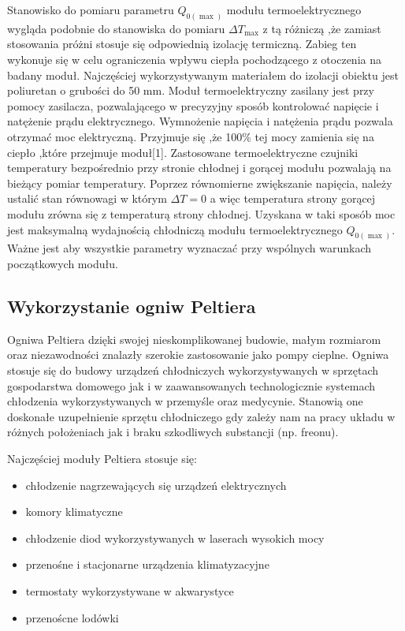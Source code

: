 \documentclass[oneside]{mgr}
\begin{document}
Stanowisko do pomiaru parametru $Q_{0(\max)}$ modułu termoelektrycznego wygląda podobnie do stanowiska do pomiaru $\Delta T_{\max}$ z tą różniczą ,że zamiast stosowania próżni stosuje się odpowiednią izolację termiczną. Zabieg ten wykonuje się w celu ograniczenia wpływu ciepła pochodzącego z otoczenia na badany moduł. Najczęściej wykorzystywanym materiałem do izolacji obiektu jest poliuretan o grubości do 50 mm. Moduł termoelektryczny zasilany jest przy pomocy zasilacza, pozwalającego w precyzyjny sposób kontrolować napięcie i natężenie prądu elektrycznego. Wymnożenie napięcia i natężenia prądu pozwala otrzymać moc elektryczną. Przyjmuje się ,że 100\% tej mocy zamienia się na ciepło ,które przejmuje moduł[1]. Zastosowane termoelektryczne czujniki temperatury bezpośrednio przy stronie chłodnej i gorącej modułu pozwalają na bieżący pomiar temperatury. Poprzez równomierne zwiększanie napięcia, należy ustalić stan równowagi w którym $\Delta T = 0$ a więc temperatura strony gorącej modułu zrówna się z temperaturą strony chłodnej. Uzyskana w taki sposób moc jest maksymalną wydajnością chłodniczą modułu termoelektrycznego $Q_{0(\max)}$. Ważne jest aby wszystkie parametry wyznaczać przy wspólnych warunkach początkowych modułu.

\subsection{Wykorzystanie ogniw Peltiera}

Ogniwa Peltiera dzięki swojej nieskomplikowanej budowie, małym rozmiarom oraz niezawodności znalazły szerokie zastosowanie jako pompy cieplne. Ogniwa stosuje się do budowy urządzeń chłodniczych wykorzystywanych w sprzętach gospodarstwa domowego jak i w zaawansowanych technologicznie systemach chłodzenia wykorzystywanych w przemyśle oraz medycynie. Stanowią one doskonałe uzupełnienie sprzętu chłodniczego gdy zależy nam na pracy układu w różnych położeniach jak i braku szkodliwych substancji (np. freonu).

Najczęściej moduły Peltiera stosuje się:
\begin{itemize}
    \item chłodzenie nagrzewających się urządzeń elektrycznych
    \item komory klimatyczne
    \item chłodzenie diod wykorzystywanych w laserach wysokich mocy
    \item przenośne i stacjonarne urządzenia klimatyzacyjne
    \item termostaty wykorzystywane w akwarystyce
    \item przenoścne lodówki
\end{itemize}
\end{document}
